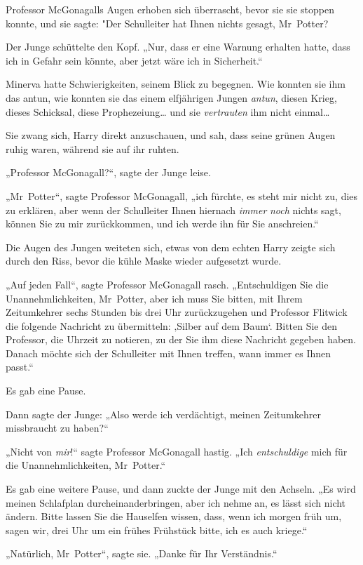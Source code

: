 {Professor McGonagalls Augen erhoben sich überrascht, bevor sie sie stoppen konnte, und sie sagte: "Der Schulleiter hat Ihnen nichts gesagt, Mr~Potter?

Der Junge schüttelte den Kopf. „Nur, dass er eine Warnung erhalten hatte, dass ich in Gefahr sein könnte, aber jetzt wäre ich in Sicherheit.“

Minerva hatte Schwierigkeiten, seinem Blick zu begegnen. Wie konnten sie ihm das antun, wie konnten sie das einem elfjährigen Jungen \emph{antun}, diesen Krieg, dieses Schicksal, diese Prophezeiung… und sie \emph{vertrauten} ihm nicht einmal…

Sie zwang sich, Harry direkt anzuschauen, und sah, dass seine grünen Augen ruhig waren, während sie auf ihr ruhten.

„Professor McGonagall?“, sagte der Junge leise.

„Mr~Potter“, sagte Professor McGonagall, „ich fürchte, es steht mir nicht zu, dies zu erklären, aber wenn der Schulleiter Ihnen hiernach \emph{immer} \emph{noch} nichts sagt, können Sie zu mir zurückkommen, und ich werde ihn für Sie anschreien.“

Die Augen des Jungen weiteten sich, etwas von dem echten Harry zeigte sich durch den Riss, bevor die kühle Maske wieder aufgesetzt wurde.

„Auf jeden Fall“, sagte Professor McGonagall rasch. „Entschuldigen Sie die Unannehmlichkeiten, Mr~Potter, aber ich muss Sie bitten, mit Ihrem Zeitumkehrer sechs Stunden bis drei Uhr zurückzugehen und Professor Flitwick die folgende Nachricht zu übermitteln: ‚Silber auf dem Baum`. Bitten Sie den Professor, die Uhrzeit zu notieren, zu der Sie ihm diese Nachricht gegeben haben. Danach möchte sich der Schulleiter mit Ihnen treffen, wann immer es Ihnen passt.“

Es gab eine Pause.

Dann sagte der Junge: „Also werde ich verdächtigt, meinen Zeitumkehrer missbraucht zu haben?“

„Nicht von \emph{mir}!“ sagte Professor McGonagall hastig. „Ich \emph{entschuldige} mich für die Unannehmlichkeiten, Mr~Potter.“

Es gab eine weitere Pause, und dann zuckte der Junge mit den Achseln. „Es wird meinen Schlafplan durcheinanderbringen, aber ich nehme an, es lässt sich nicht ändern. Bitte lassen Sie die Hauselfen wissen, dass, wenn ich morgen früh um, sagen wir, drei Uhr um ein frühes Frühstück bitte, ich es auch kriege.“

„Natürlich, Mr~Potter“, sagte sie. „Danke für Ihr Verständnis.“

}
